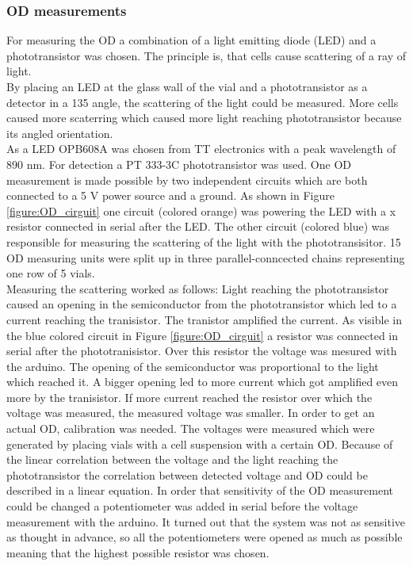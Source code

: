 \subsubsection{OD measurements}
For measuring the OD a combination of a light emitting diode (LED) and a phototransistor was chosen. The principle is, that cells cause scattering of a ray of light. \\
By placing an LED at the glass wall of the vial and a phototransistor as a detector in a 135 \degree \space angle, the scattering of the light could be measured. More cells caused more scaterring which caused more light reaching phototransistor because its angled orientation. \\
As a LED OPB608A was chosen from TT electronics with a peak wavelength of 890 nm. For detection a PT 333-3C phototransistor was used. One OD measurement is made possible by two independent circuits which are both connected to a 5 V power source and a ground. As shown in Figure \ref{figure:OD_cirguit} one circuit (colored orange) was powering the LED with a x \textOmega \space resistor connected in serial after the LED. The other circuit (colored blue) was responsible for measuring the scattering of the light with the phototransisitor. 15 OD measuring units were split up in three parallel-conncected chains representing one row of 5 vials. \\
Measuring the scattering worked as follows: Light reaching the phototransistor caused an opening in the semiconductor from the phototransistor which led to a current reaching the tranisistor. The tranistor amplified the current. As visible in the blue colored circuit in Figure \ref{figure:OD_cirguit} a resistor was connected in serial after the phototranisistor. Over this resistor the voltage was mesured with the arduino. The opening of the semiconductor was proportional to the light which reached it. A bigger opening led to more current which got amplified even more by the tranisistor. If more current reached the resistor over which the voltage was measured, the measured voltage was smaller. In order to get an actual OD, calibration was needed. The voltages were measured which were generated by placing vials with a cell suspension with a certain OD. Because of the linear correlation between the voltage and the light reaching the phototransistor the correlation between detected voltage and OD could be described in a linear equation.  
In order that sensitivity of the OD measurement could be changed a potentiometer was added in serial before the voltage measurement with the arduino. It turned out that the system was not as sensitive as thought in advance, so all the potentiometers were opened as much as possible meaning that the highest possible resistor was chosen.   


